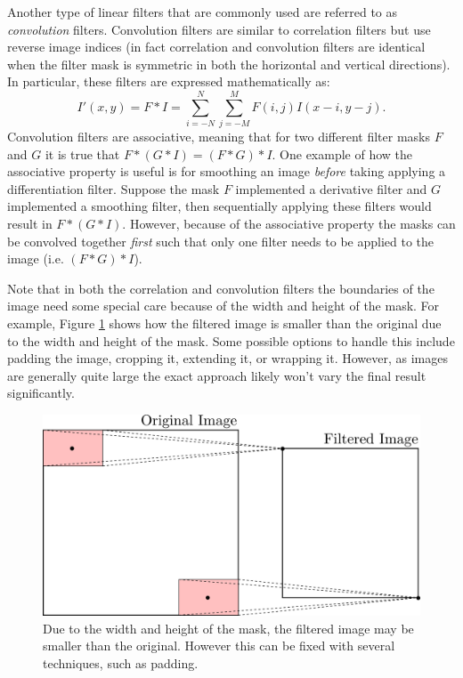 Another type of linear filters that are commonly used are referred to as \textit{convolution} filters. Convolution filters are similar to correlation filters but use reverse image indices (in fact correlation and convolution filters are identical when the filter mask is symmetric in both the horizontal and vertical directions). In particular, these filters are expressed mathematically as:
\begin{equation}
  \label{eq:convolution}
    I'(x,y) = F \ast I = \sum_{i=-N}^N \sum_{j=-M}^M F(i,j)I(x-i,y-j).
\end{equation}
Convolution filters are associative, meaning that for two different filter masks $F$ and $G$ it is true that $F*(G*I) = (F*G)*I$. One example of how the associative property is useful is for smoothing an image \textit{before} taking applying a differentiation filter. Suppose the mask $F$ implemented a derivative filter and $G$ implemented a smoothing filter, then sequentially applying these filters would result in $F*(G*I)$. However, because of the associative property the masks can be convolved together \textit{first} such that only one filter needs to be applied to the image (i.e. $(F*G)*I$).

Note that in both the correlation and convolution filters the boundaries of the image need some special care because of the width and height of the mask. For example, Figure \ref{fig:nopaddingexample} shows how the filtered image is smaller than the original due to the width and height of the mask. Some possible options to handle this include padding the image, cropping it, extending it, or wrapping it. However, as images are generally quite large the exact approach likely won't vary the final result significantly.
\begin{figure}[ht]
  \centering
  \includegraphics[width=.65\textwidth]{tex/figs/ch11_figs/centerfilter_nopadding.png}
    \caption{Due to the width and height of the mask, the filtered image may be smaller than the original. However this can be fixed with several techniques, such as padding.}
    \label{fig:nopaddingexample}
\end{figure}

